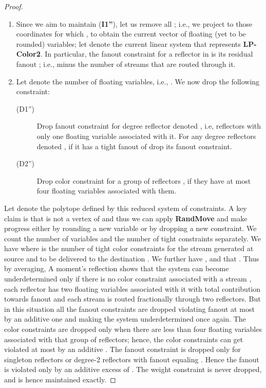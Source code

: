 \begin{proof}
\begin{enumerate}
\item Since we aim to maintain ({\bf I1''}), let us remove all ; i.e.,
we project  to those coordinates  for which , to obtain the
current vector  of floating (yet to be rounded) variables; let  denote
the current linear system that represents {\bf LP-Color2}. In particular, the fanout constraint
for a reflector in  is its residual fanout ; i.e.,  minus the
number of streams that are routed through it.
\item Let  denote the number of floating variables, i.e., . We now drop the following constraint:
    \begin{description}
    \item[(D1'')] Drop fanout constraint for degree  reflector denoted , i.e, reflectors with only one floating variable associated with it. For any degree  reflectors denoted , if
        it has a tight fanout of  drop its fanout constraint.
    \item[(D2'')] Drop color constraint for a group of reflectors , if they have at most four floating variables associated with them.
    \end{description}
    \end{enumerate}
Let  denote the polytope defined by this reduced system of constraints.
A key claim is that  is not a vertex of  and thus we can apply
{\bf RandMove} and make progress either by rounding a new variable or by dropping
a new constraint. We count the number of variables  and the number of tight constraints
  separately. We have  where
  is the number of tight color constraints for the stream generated at source 
 and to be delivered to the  destination .  We further have , and that
. Thus by averaging,  A moment's reflection shows that the
 system can become underdetermined only if there is no color constraint associated with a stream , each reflector  has two floating variables associated with it with total contribution  towards fanout and each stream  is routed fractionally through two reflectors. But in this situation all the fanout constraints are dropped violating fanout at most by an additive one and making the system underdetermined once again.
The color constraints are dropped only when there are less than four
floating variables associated with that group  of reflectors; hence, the color constraints can get violated at most by an additive . The fanout constraint is dropped only for singleton reflectors or degree-2 reflectors with fanout equaling . Hence the fanout is violated only by an additive
excess of . The weight constraint is never dropped, and
is hence maintained exactly.
\end{proof}
